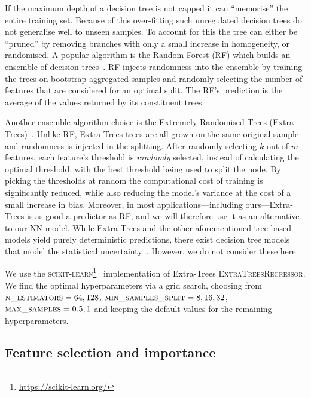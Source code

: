 \documentclass[useAMS,usenatbib]{mnras}
\begin{document}
If the maximum depth of a decision tree is not capped it can ``memorise'' the entire training set. Because of this over-fitting such unregulated decision trees do not generalise well to unseen samples. To account for this the tree can either be ``pruned'' by removing branches with only a small increase in homogeneity, or randomised. A popular algorithm is the Random Forest (RF) which builds an ensemble of decision trees~\citep{Breiman_2001_RandomForest}. RF injects randomness into the ensemble by training the trees on bootstrap aggregated samples and randomly selecting the number of features that are considered for an optimal split. The RF's prediction is the average of the values returned by its constituent trees.

Another ensemble algorithm choice is the Extremely Randomised Trees (Extra-Trees)~\citep{Geurts_2006_ExtraTrees}. Unlike RF, Extra-Trees trees are all grown on the same original sample and randomness is injected in the splitting. After randomly selecting $k$ out of $m$ features, each feature's threshold is \emph{randomly} selected, instead of calculating the optimal threshold, with the best threshold being used to split the node. By picking the thresholds at random the computational cost of training is significantly reduced, while also reducing the model's variance at the cost of a small increase in bias. Moreover, in most applications---including ours---Extra-Trees is as good a predictor as RF, and we will therefore use it as an alternative to our NN model. While Extra-Trees and the other aforementioned tree-based models yield purely deterministic predictions, there exist decision tree models that model the statistical uncertainty~\citep[e.g.][]{BART, NGBoost}. However, we do not consider these here.

We use the \textsc{scikit-learn}\footnote{\url{https://scikit-learn.org/}}~\citep{scikit-learn} implementation of Extra-Trees \textsc{ExtraTreesRegressor}. We find the optimal hyperparameters via a grid search, choosing from $\textsc{n\_estimators}=64, 128$, $\textsc{min\_samples\_split}=8, 16, 32$, $\textsc{max\_samples} = 0.5, 1$ and keeping the default values for the remaining hyperparameters.


\subsection{Feature selection and importance}
\label{sec:feature_selection}
\end{document}
